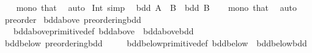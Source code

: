 \begin{isabellebody}
%
\isadelimproof
\ \ %
\endisadelimproof
%
\isatagproof
{}\isamarkupfalse%
\ mono\ that\ \isamarkupfalse%
\ auto%
\endisatagproof
{\isafoldproof}%
%
\isadelimproof
\isanewline
%
\endisadelimproof
\isanewline
{}\isamarkupfalse%
\ Int{}\ {\isacharbrackleft}{\kern0pt}simp{\isacharbrackright}{\kern0pt}{\isacharcolon}{\kern0pt}\isanewline
\ \ {\isacartoucheopen}bdd\ {\isacharparenleft}{\kern0pt}A\ {\isasyminter}\ B{\isacharparenright}{\kern0pt}{\isacartoucheclose}\ \ {\isacartoucheopen}bdd\ B{\isacartoucheclose}\isanewline
%
\isadelimproof
\ \ %
\endisadelimproof
%
\isatagproof
{}\isamarkupfalse%
\ mono\ that\ \isamarkupfalse%
\ auto%
\endisatagproof
{\isafoldproof}%
%
\isadelimproof
\isanewline
%
\endisadelimproof
\isanewline
{}\isamarkupfalse%
\isanewline
\isanewline
{}\isamarkupfalse%
\ preorder\isanewline
{}\isanewline
\isanewline
{}\isamarkupfalse%
\ bdd{\isacharunderscore}{\kern0pt}above{\isacharcolon}{\kern0pt}\ preordering{\isacharunderscore}{\kern0pt}bdd\ {\isacartoucheopen}{\isacharparenleft}{\kern0pt}{\isasymle}{\isacharparenright}{\kern0pt}{\isacartoucheclose}\ {\isacartoucheopen}{\isacharparenleft}{\kern0pt}{\isacharless}{\kern0pt}{\isacharparenright}{\kern0pt}{\isacartoucheclose}\isanewline
\ \ \ bdd{\isacharunderscore}{\kern0pt}above{\isacharunderscore}{\kern0pt}primitive{\isacharunderscore}{\kern0pt}def{\isacharcolon}{\kern0pt}\ bdd{\isacharunderscore}{\kern0pt}above\ {\isacharequal}{\kern0pt}\ bdd{\isacharunderscore}{\kern0pt}above{\isachardot}{\kern0pt}bdd%
\isadelimproof
\ %
\endisadelimproof
%
\isatagproof
\isacommand{{\isachardot}{\kern0pt}{\isachardot}{\kern0pt}}\isamarkupfalse%
%
\endisatagproof
{\isafoldproof}%
%
\isadelimproof
%
\endisadelimproof
\isanewline
\isanewline
{}\isamarkupfalse%
\ bdd{\isacharunderscore}{\kern0pt}below{\isacharcolon}{\kern0pt}\ preordering{\isacharunderscore}{\kern0pt}bdd\ {\isacartoucheopen}{\isacharparenleft}{\kern0pt}{\isasymge}{\isacharparenright}{\kern0pt}{\isacartoucheclose}\ {\isacartoucheopen}{\isacharparenleft}{\kern0pt}{\isachargreater}{\kern0pt}{\isacharparenright}{\kern0pt}{\isacartoucheclose}\isanewline
\ \ \ bdd{\isacharunderscore}{\kern0pt}below{\isacharunderscore}{\kern0pt}primitive{\isacharunderscore}{\kern0pt}def{\isacharcolon}{\kern0pt}\ bdd{\isacharunderscore}{\kern0pt}below\ {\isacharequal}{\kern0pt}\ bdd{\isacharunderscore}{\kern0pt}below{\isachardot}{\kern0pt}bdd%

\end{isabellebody}
